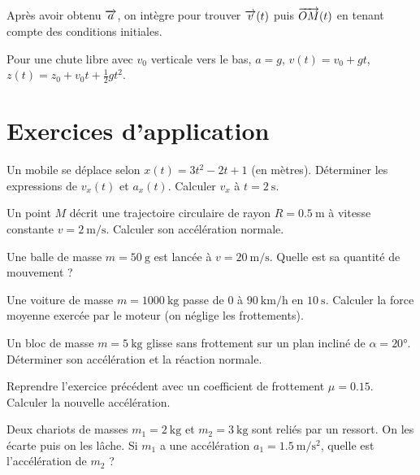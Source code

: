 Après avoir obtenu $\overrightarrow{a}$, on intègre pour trouver $\overrightarrow{v}(t)$ puis $\overrightarrow{OM}(t)$ en tenant compte des conditions initiales.
\begin{exemple}
Pour une chute libre avec $v_0$ verticale vers le bas, $a=g$, $v(t)=v_0+gt$, $z(t)=z_0+v_0 t+\frac{1}{2}gt^{2}$.
\end{exemple}

\section{Exercices d’application}


\exo{} Un mobile se déplace selon $x(t)=3t^{2}-2t+1$ (en mètres). Déterminer les expressions de $v_x(t)$ et $a_x(t)$. Calculer $v_x$ à $t=\SI{2}{\second}$.

\exo{} Un point $M$ décrit une trajectoire circulaire de rayon $R=\SI{0.5}{\metre}$ à vitesse constante $v=\SI{2}{\metre\per\second}$. Calculer son accélération normale.


\exo{} Une balle de masse $m=\SI{50}{\gram}$ est lancée à $v=\SI{20}{\metre\per\second}$. Quelle est sa quantité de mouvement ?

\exo{} Une voiture de masse $m=\SI{1000}{\kilogram}$ passe de $0$ à $\SI{90}{\kilo\metre\per\hour}$ en $\SI{10}{\second}$. Calculer la force moyenne exercée par le moteur (on néglige les frottements).


\exo{} Un bloc de masse $m=\SI{5}{\kilogram}$ glisse sans frottement sur un plan incliné de $\alpha=\ang{20}$. Déterminer son accélération et la réaction normale.

\exo{} Reprendre l’exercice précédent avec un coefficient de frottement $\mu=0.15$. Calculer la nouvelle accélération.


\exo{} Deux chariots de masses $m_1=\SI{2}{\kilogram}$ et $m_2=\SI{3}{\kilogram}$ sont reliés par un ressort. On les écarte puis on les lâche. Si $m_1$ a une accélération $a_1=\SI{1.5}{\metre\per\second\squared}$, quelle est l’accélération de $m_2$ ?

